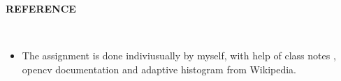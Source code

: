 \documentclass[11pt,a4paper,sans]{moderncv}        %
\newcommand{\lsep}{-0.5cm}
\newcommand{\resheading}[1]{{\small \colorbox{mygrey}{\begin{minipage}{0.975\textwidth}{\textbf{#1 \vphantom{p\^{E}}}}\end{minipage}}}}
\begin{document}
\vspace{6pt}

 \resheading{\textbf{{\selectfont REFERENCE}} }\\[\lsep]

\vspace{6pt}
\begin{itemize}
\item \noindent The assignment is done indiviusually by myself, with help of class notes , opencv documentation and adaptive histogram from Wikipedia. 
\end{itemize}




\end{document}

